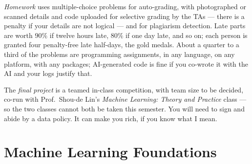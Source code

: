 \documentclass[a4paper,oneside]{scrbook}
\begin{document}
\emph{Homework} uses multiple-choice problems for auto-grading, with photographed
or scanned details and code uploaded for selective grading by the TAs --- there
is a penalty if your details are not logical --- and for plagiarism detection.
Late parts are worth \(90\%\) if twelve hours late, \(80\%\) if one day late, and
so on; each person is granted four penalty-free late half-days, the gold medals.
About a quarter to a third of the problems are programming assignments, in any
language, on any platform, with any packages; AI-generated code is fine if you
co-wrote it with the AI and your logs justify that.

The \emph{final project} is a teamed in-class competition, with team size to be
decided, co-run with Prof.\ Shou-de Lin's \emph{Machine Learning: Theory and
Practice} class --- so the two classes cannot both be taken this semester. You
will need to sign and abide by a data policy. It can make you rich, if you know
what I mean.

\newpage

\tableofcontents

\part{Machine Learning Foundations}


\end{document}
